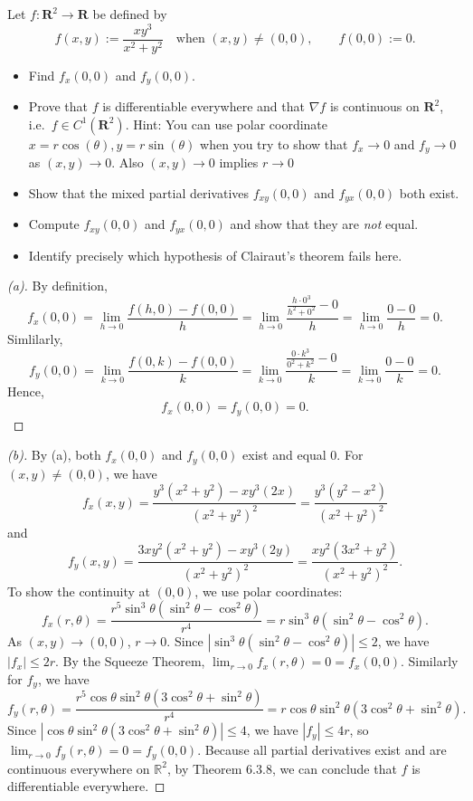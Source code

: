 \begin{problem}
    Let $f : \mathbf{R}^2 \to \mathbf{R}$ be defined by
$$
f(x,y)
:=
\frac{xy^3}{x^2+y^2}
\quad \text{when } (x,y)\ne(0,0),
\qquad
f(0,0):=0.
$$
\begin{itemize}
\item[(a)] Find $f_x(0,0)$ and $f_y(0,0)$.
 \item[(b)] Prove that $f$ is differentiable everywhere and that $\nabla f$ is continuous on $\mathbf{R}^2$, i.e.\ $f\in C^1(\mathbf{R}^2)$. Hint: You can use polar coordinate 
$x=r \cos(\theta), y=r \sin (\theta)$ when you try to show that  $f_x \to 0$ and $f_y \to 0$ as
$(x,y)\to 0$. Also $(x,y)\to 0$ implies $r\to 0$
\item[(c)] Show that the mixed partial derivatives $f_{xy}(0,0)$ and $f_{yx}(0,0)$ both exist.
\item[(d)] Compute $f_{xy}(0,0)$ and $f_{yx}(0,0)$ and show that they are \emph{not} equal.
\item[(e)] Identify precisely which hypothesis of Clairaut's theorem fails here.
\end{itemize}
\end{problem}

\begin{proof}[(a)]
    By definition,
    \[
    f_x(0,0) = \lim_{h \to 0} \frac{f(h,0) - f(0,0)}{h} = \lim_{h \to 0} \frac{\frac{h \cdot0^3}{h^2+0^2}-0}{h} = \lim_{h \to 0} \frac{0 - 0}{h} = 0.
    \]
    Simlilarly,
    \[
    f_y(0,0) = \lim_{k \to 0} \frac{f(0,k) - f(0,0)}{k} = \lim_{k \to 0} \frac{\frac{0\cdot k^3}{0^2+k^2}-0}{k} = \lim_{k \to 0} \frac{0 - 0}{k} = 0.
    \]
    Hence,
    \[
    f_x(0,0)=f_y(0,0)=0.
    \]
\end{proof}

\begin{proof}[(b)]
    By (a), both $f_x(0,0)$ and $f_y(0,0)$ exist and equal 0. For $(x,y)\neq(0,0)$, we have
    \[
    f_x(x,y) = \frac{y^3(x^2+y^2) - xy^3(2x)}{(x^2+y^2)^2} = \frac{y^3(y^2-x^2)}{(x^2+y^2)^2}
    \]
    and
    \[
    f_y(x,y) = \frac{3xy^2(x^2+y^2) - xy^3(2y)}{(x^2+y^2)^2} = \frac{xy^2(3x^2+y^2)}{(x^2+y^2)^2}.
    \]
    To show the continuity at $(0,0)$, we use polar coordinates:
    \[
    f_x(r,\theta) = \frac{r^5 \sin^3\theta (\sin^2\theta - \cos^2\theta)}{r^4} = r \sin^3\theta (\sin^2\theta - \cos^2\theta).
    \]
    As $(x,y) \to (0,0)$, $r \to 0$. Since $|\sin^3\theta (\sin^2\theta - \cos^2\theta)| \le 2$, we have $|f_x| \le 2r$. By the Squeeze Theorem, $\lim_{r \to 0} f_x(r,\theta) = 0 = f_x(0,0)$. Similarly for $f_y$, we have
    \[
    f_y(r,\theta) = \frac{r^5 \cos\theta \sin^2\theta (3\cos^2\theta + \sin^2\theta)}{r^4} = r \cos\theta \sin^2\theta (3\cos^2\theta + \sin^2\theta).
    \]
    Since $|\cos\theta \sin^2\theta (3\cos^2\theta + \sin^2\theta)| \le 4$, we have $|f_y| \le 4r$, so $\lim_{r \to 0} f_y(r,\theta) = 0 = f_y(0,0)$. Because all partial derivatives exist and are continuous everywhere on $\mathbb{R}^2$, by Theorem 6.3.8, we can conclude that $f$ is differentiable everywhere.
\end{proof}

